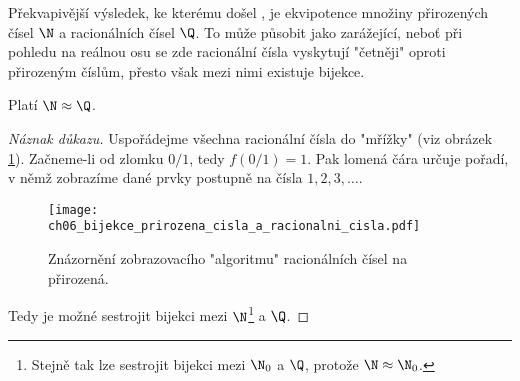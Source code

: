 Překvapivější výsledek, ke kterému došel , je ekvipotence množiny přirozených čísel $\N$ a racionálních čísel $\Q$. To může působit jako zarážející, neboť při pohledu na reálnou osu se zde racionální čísla vyskytují "četněji" oproti přirozeným číslům, přesto však mezi nimi existuje bijekce.
\begin{theorem}\label{thm:N_a_Q}
    Platí $\N\approx\Q$.
\end{theorem}
\begin{proof}[Náznak důkazu]
    Uspořádejme všechna racionální čísla do "mřížky" (viz obrázek \ref{fig:bijekce_prirozena_cisla_a_racionalni_cisla}). Začneme-li od zlomku $0/1$, tedy $f(0/1)=1$. Pak lomená čára určuje pořadí, v němž zobrazíme dané prvky postupně na čísla $1,2,3,\dots$.
    \begin{figure}[H]
        \centering
        \texttt{[image: ch06\_bijekce\_prirozena\_cisla\_a\_racionalni\_cisla.pdf]}
        \caption{Znázornění zobrazovacího "algoritmu" racionálních čísel na přirozená.}
        \label{fig:bijekce_prirozena_cisla_a_racionalni_cisla}
    \end{figure}
    Tedy je možné sestrojit bijekci mezi $\N$\footnote{Stejně tak lze sestrojit bijekci mezi $\N_0$ a $\Q$, protože $\N\approx\N_0$.} a $\Q$.
\end{proof}
\medskip

